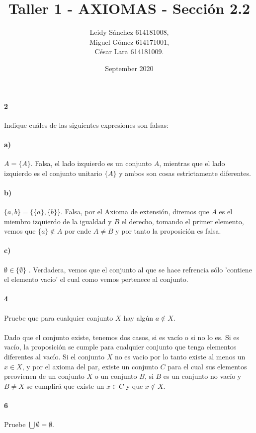 \documentclass{article}
\title{Taller 1 - AXIOMAS - Sección 2.2}
\author{Leidy Sánchez 614181008, \\ Miguel Gómez 614171001,\\ César Lara 614181009.}
\date{September 2020}
\begin{document}
	\maketitle
	\paragraph{2} Indique cuáles de las siguientes expresiones son falsas:
	\paragraph{a)} $A = \{ A \}$. Falsa, el lado izquierdo es un conjunto $A$, mientras que el lado izquierdo es el conjunto unitario $\{A\}$ y ambos son cosas estrictamente diferentes.
	\paragraph{b)} $\{ a, b \} = \{ \{a\}, \{b\} \}$. Falsa, por el Axioma de extensión, diremos que $A$ es el miembro izquierdo de la igualdad y $B$ el derecho, tomando el primer elemento, vemos que $\{a\} \notin A$ por ende $A \neq B$ y por tanto la proposición es falsa.
	\paragraph{c)} $\emptyset \in \{\emptyset\}$ . Verdadera, vemos que el conjunto al que se hace refrencia sólo 'contiene el elemento vacío' el cual como vemos pertenece al conjunto.
	\paragraph{4} Pruebe que para cualquier conjunto $X$ hay algún $a \notin X$.
	\paragraph{} Dado que el conjunto existe, tenemos dos casos, si es vacío o si no lo es. Si es vacío, la proposición se cumple para cualquier conjunto que tenga elementos diferentes al vacío. Si el conjunto $X$ no es vacio por lo tanto existe al menos un $x \in X$, y por el axioma del par, existe un conjunto $C$ para el cual sus elementos preovienen de un conjunto $X$ o un conjunto $B$, si $B$ es un conjunto no vacío y $B \neq X$ se cumplirá que existe un $x \in C$ y que $x \notin X$.
	\paragraph{6} Pruebe $\bigcup\emptyset = \emptyset$.
\end{document}
